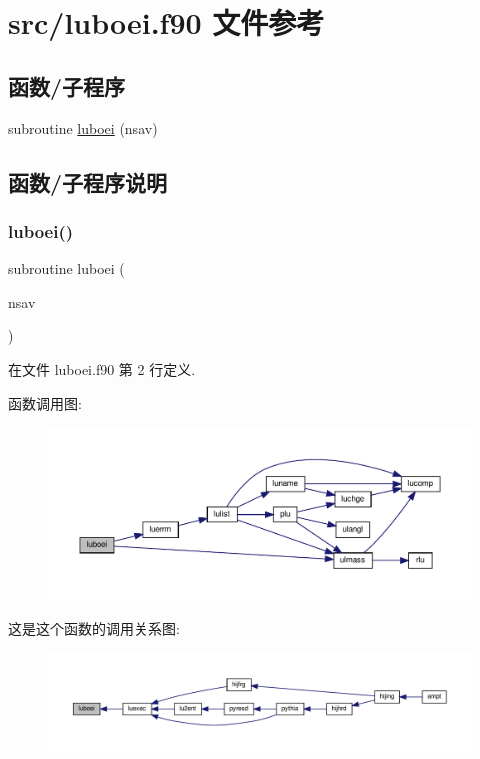 \hypertarget{luboei_8f90}{}\section{src/luboei.f90 文件参考}
\label{luboei_8f90}
\subsection*{函数/子程序}
\begin{DoxyCompactItemize}
\item 
subroutine \mbox{\hyperlink{luboei_8f90_ae695b360c5bd96dac6c7b3007376176c}{luboei}} (nsav)
\end{DoxyCompactItemize}


\subsection{函数/子程序说明}
\mbox{\label{luboei_8f90_ae695b360c5bd96dac6c7b3007376176c}} 
\subsubsection{\texorpdfstring{luboei()}{luboei()}}
{\footnotesize\ttfamily subroutine luboei (\begin{DoxyParamCaption}\item[{}]{nsav }\end{DoxyParamCaption})}



在文件 luboei.\+f90 第 2 行定义.

函数调用图\+:
\nopagebreak
\begin{figure}[H]
\begin{center}
\leavevmode
\includegraphics[width=350pt]{luboei_8f90_ae695b360c5bd96dac6c7b3007376176c_cgraph}
\end{center}
\end{figure}
这是这个函数的调用关系图\+:
\nopagebreak
\begin{figure}[H]
\begin{center}
\leavevmode
\includegraphics[width=350pt]{luboei_8f90_ae695b360c5bd96dac6c7b3007376176c_icgraph}
\end{center}
\end{figure}
